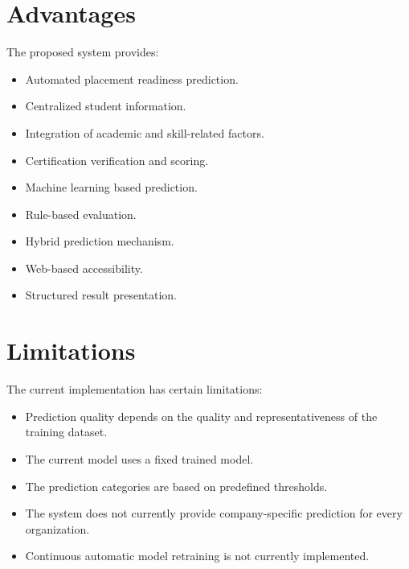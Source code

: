 \documentclass[12pt,a4paper]{report}
\begin{document}
\section{Advantages}

The proposed system provides:

\begin{itemize}
    \item Automated placement readiness prediction.
    \item Centralized student information.
    \item Integration of academic and skill-related factors.
    \item Certification verification and scoring.
    \item Machine learning based prediction.
    \item Rule-based evaluation.
    \item Hybrid prediction mechanism.
    \item Web-based accessibility.
    \item Structured result presentation.
\end{itemize}

\section{Limitations}

The current implementation has certain limitations:

\begin{itemize}
    \item Prediction quality depends on the quality and
    representativeness of the training dataset.

    \item The current model uses a fixed trained model.

    \item The prediction categories are based on predefined
    thresholds.

    \item The system does not currently provide company-specific
    prediction for every organization.

    \item Continuous automatic model retraining is not currently
    implemented.
\end{itemize}

\end{document}
